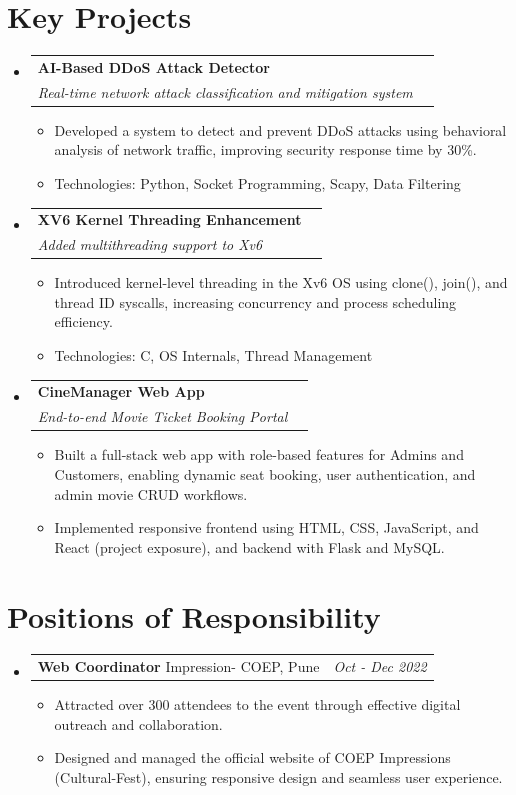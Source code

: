 \documentclass[a4paper,11pt]{article}
\makeatletter
\newcommand{\resumePOR}[3]{
\vspace{0.5mm}\item
    \begin{tabular*}{0.97\textwidth}[t]{l@{\extracolsep{\fill}}r}
        \textbf{#1}\hspace{0.3mm}#2 & \textit{\small{#3}} 
    \end{tabular*}
    \vspace{-2mm}
}
\newcommand{\resumeProject}[4]{
\vspace{0.5mm}\item
    \begin{tabular*}{0.98\textwidth}[t]{l@{\extracolsep{\fill}}r}
        \textbf{#1} & \textit{\footnotesize{#3}} \\
        \footnotesize{\textit{#2}} & \footnotesize{#4}
    \end{tabular*}
    \vspace{-2.4mm}
}
\newcommand{\resumeSubHeadingListStart}{\begin{itemize}[leftmargin=*,labelsep=0mm]}
\newcommand{\resumeItemListStart}{\begin{justify}\begin{itemize}[leftmargin=3ex, rightmargin=2ex, noitemsep,labelsep=1.2mm,itemsep=0mm]\small}
\newcommand{\resumeSubHeadingListEnd}{\end{itemize}\vspace{2mm}}
\newcommand{\resumeItemListEnd}{\end{itemize}\end{justify}\vspace{-2mm}}
\makeatother
\begin{document}
\section{\textbf{Key Projects}}
\resumeSubHeadingListStart

\resumeProject
{AI-Based DDoS Attack Detector}{Real-time network attack classification and mitigation system}
{}{}
\begin{itemize}
  \item Developed a system to detect and prevent DDoS attacks using behavioral analysis of network traffic, improving security response time by 30\%.
  \item Technologies: Python, Socket Programming, Scapy, Data Filtering
\end{itemize}

\resumeProject
{XV6 Kernel Threading Enhancement}{Added multithreading support to Xv6}
{}{}
\begin{itemize}
  \item Introduced kernel-level threading in the Xv6 OS using clone(), join(), and thread ID syscalls, increasing concurrency and process scheduling efficiency.
  \item Technologies: C, OS Internals, Thread Management
\end{itemize}

\resumeProject
{CineManager Web App}{End-to-end Movie Ticket Booking Portal}
{}{}
\begin{itemize}
  \item Built a full-stack web app with role-based features for Admins and Customers, enabling dynamic seat booking, user authentication, and admin movie CRUD workflows.
  \item Implemented responsive frontend using HTML, CSS, JavaScript, and React (project exposure), and backend with Flask and MySQL.
\end{itemize}

\resumeSubHeadingListEnd

\section{\textbf{Positions of Responsibility}}
\vspace{-0.4mm}
\resumeSubHeadingListStart
\resumePOR{Web Coordinator } %
    {Impression- COEP, Pune} %
    {Oct - Dec 2022} %
    \resumeItemListStart
    \item {Attracted over 300 attendees to the event through effective digital outreach and collaboration.}
    \item {Designed and managed the official website of COEP Impressions (Cultural-Fest), ensuring responsive design and seamless user experience.}
    \resumeItemListEnd

\resumeSubHeadingListEnd
\vspace{-5mm}

\end{document}
